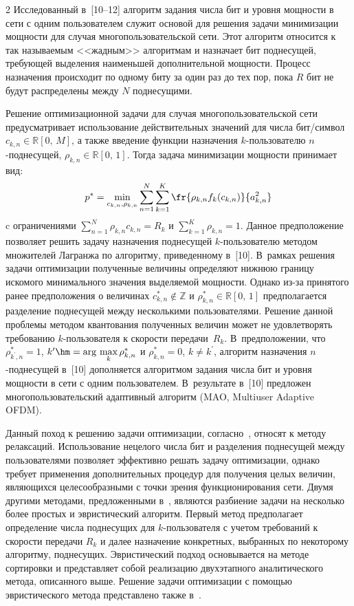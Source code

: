 \begin{multicols}{2}
  Исследованный в~[10--12] алгоритм задания чис\-ла бит и уровня мощности в сети с 
одним пользователем служит основой для решения задачи минимиза\-ции мощ\-ности для 
случая многопользовательской сети. Этот алгоритм относится к так называемым 
<<жад\-ным>> алгоритмам и назначает бит под\-не\-су\-щей, требующей выделения 
наименьшей дополнительной мощности. Процесс назначения происходит по одному биту 
за один раз до тех пор, пока $R$ бит не будут распределены между $N$ поднесущими.
  
  Решение оптимизационной задачи для случая многопользовательской сети 
предусматривает использование действительных значений для числа бит/символ 
$c_{k,n}\in \mathbb{R}[0,\,M]$, а также введение функции назначения $k$-поль\-зо\-ва\-те\-лю 
  $n$-под\-не\-су\-щей, $\rho_{k,n}\in \mathbb{R}[0,\,1]$. Тогда задача минимизации 
мощности принимает вид:
$$
p^*=\min\limits_{c_{k,n},\rho_{k,n}} \sum\limits_{n=1}^N 
\sum\limits_{k=1}^K \fr{\rho_{k,n} f_k(c_{k,n})}{a_{k,n}^2}
$$
c ограничениями $\sum\limits_{n=1}^N \rho_{k,n}c_{k,n}=R_k$ и $\sum\limits_{k=1}^K 
\rho_{k,n}=1$. Данное предположение позволяет решить задачу назначения поднесущей 
  $k$-пользователю методом множителей Лагранжа по алгоритму, приведенному в~[10]. 
В~рамках решения задачи оптимизации полученные величины определяют нижнюю 
границу искомого минимального значения выделяемой мощности. Однако из-за 
принятого ранее предположения о величинах $c^*_{k,n}\not\in \mathbb{Z}$ и 
$\rho_{k,n}^*\in \mathbb{R}[0,\,1]$ предполагается разделение поднесущей между 
несколькими пользователями. Решение данной проблемы методом квантования 
полученных величин может не удовлетворять требованию $k$-пользователя к скорости 
передачи~$R_k$. В~предположении, что $\rho_{k^\prime,n}^*=1$, 
$k^\prime\hm=\mathrm{arg}\,\max\limits_k \rho_{k,n}^*$ и $\rho^*_{k,n}=0$, 
$k\not=k^\prime$, алгоритм назначения $n$-поднесущей в~[10] дополняется алгоритмом 
задания числа бит и уровня мощности в сети с одним пользователем. В~результате в~[10] 
предложен многопользовательский адаптивный алгоритм (MAO, Multiuser Adaptive 
OFDM).
  
  Данный поход к решению задачи оптимизации, согласно~\cite{13-gai}, относят к 
методу релаксаций. Использование нецелого числа бит и разделения поднесущей между 
пользователями позволяет эффективно решать задачу оптимизации, однако требует 
применения дополнительных процедур для получения целых величин, являющихся 
целесообразными с точки зрения функционирования сети. Двумя другими методами, 
предложенными в~\cite{13-gai}, являются разбиение задачи на несколько более прос\-тых и 
эвристический алгоритм. Первый метод предполагает определение числа поднесущих для 
$k$-поль\-зо\-ва\-те\-ля с учетом требований к скорости передачи $R_k$ и далее назначение 
конкретных, выбранных по некоторому алгоритму, поднесущих. Эвристический подход 
основывается на методе сортировки и представляет собой реализацию двухэтапного 
аналитического метода, описанного выше. Решение задачи оптимизации с помощью 
эвристического метода представлено также в~\cite{14-gai}.


\end{multicols}
